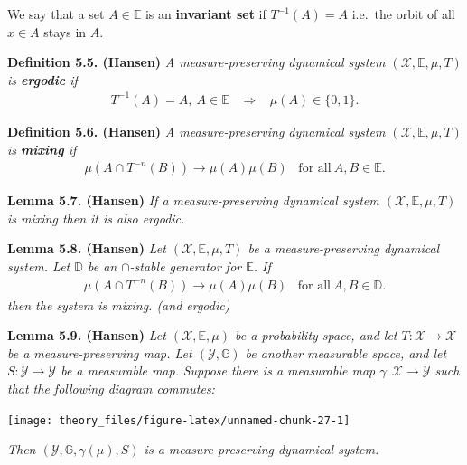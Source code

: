 \documentclass[a4paper,10pt,openany]{book}
\begin{document}
We say that a set \(A\in\mathbb{E}\) is an \textbf{invariant set} if \(T^{-1}(A)=A\) i.e.~the orbit of all \(x\in A\) stays in \(A\).

\textbf{Definition 5.5. (Hansen)} \emph{A measure-preserving dynamical system \((\mathcal{X},\mathbb{E},\mu,T)\) is \textbf{ergodic} if}
\begin{align*}
    T^{-1}(A)=A,\ A\in\mathbb{E} \hspace{10pt}\Rightarrow\hspace{10pt} \mu(A)\in\{0,1\}.\tag{5.7}
\end{align*}

\textbf{Definition 5.6. (Hansen)} \emph{A measure-preserving dynamical system \((\mathcal{X},\mathbb{E},\mu,T)\) is \textbf{mixing} if}
\begin{align*}
    \mu(A\cap T^{-n}(B))\to \mu(A)\mu(B)\hspace{10pt}\text{for all}\ A,B\in\mathbb{E}.\tag{5.8}
\end{align*}

\textbf{Lemma 5.7. (Hansen)} \emph{If a measure-preserving dynamical system \((\mathcal{X},\mathbb{E},\mu,T)\) is mixing then it is also ergodic.}

\textbf{Lemma 5.8. (Hansen)} \emph{Let \((\mathcal{X},\mathbb{E},\mu,T)\) be a measure-preserving dynamical system. Let \(\mathbb{D}\) be an \(\cap\)-stable generator for \(\mathbb{E}\). If}
\begin{align*}
        \mu(A\cap T^{-n}(B))\to \mu(A)\mu(B)\hspace{10pt}\text{for all}\ A,B\in\mathbb{D}.\tag{5.10}
\end{align*}
\emph{then the system is mixing. (and ergodic)}

\textbf{Lemma 5.9. (Hansen)} \emph{Let \((\mathcal{X},\mathbb{E},\mu)\) be a probability space, and let \(T : \mathcal{X}\to \mathcal{X}\) be a measure-preserving map. Let \((\mathcal{Y},\mathbb{G})\) be another measurable space, and let \(S : \mathcal{Y} \to \mathcal{Y}\) be a measurable map.}
\emph{Suppose there is a measurable map \(\gamma : \mathcal{X}\to \mathcal{Y}\) such that the following diagram commutes:}

\begin{center}\texttt{[image: theory\_files/figure-latex/unnamed-chunk-27-1]} \end{center}

\emph{Then \((\mathcal{Y},\mathbb{G},\gamma(\mu),S)\) is a measure-preserving dynamical system.}
\end{document}
